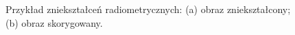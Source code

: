 \begin{figure}[!ht]
 \begin{center}
 \end{center}
 \caption{
  Przykład zniekształceń radiometrycznych:
  (a) obraz zniekształcony;
  (b) obraz skorygowany.
 }
 \label{fig:radiometric}
\end{figure}